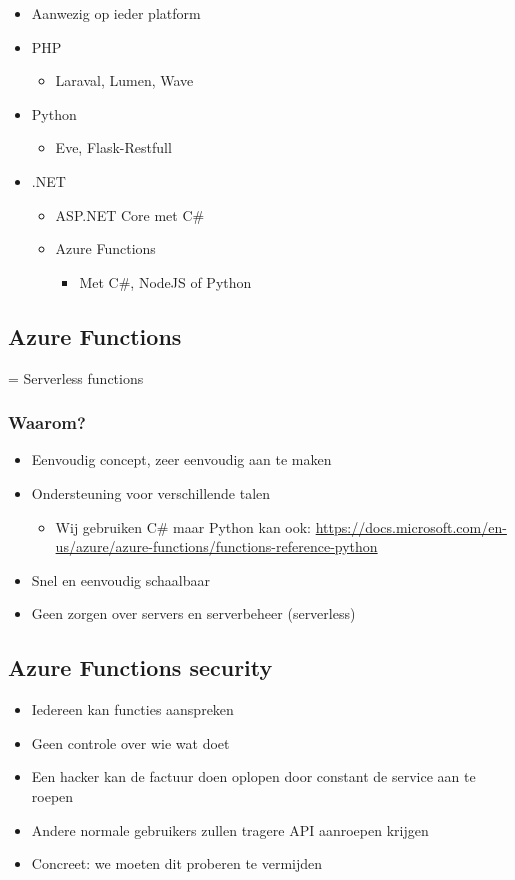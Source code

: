 \documentclass{article}
\begin{document}
\begin{itemize}
    \item Aanwezig op ieder platform
    \item PHP
    \begin{itemize}
        \item Laraval, Lumen, Wave
    \end{itemize}
    \item Python
    \begin{itemize}
        \item Eve, Flask-Restfull
    \end{itemize}
    \item .NET
    \begin{itemize}
        \item ASP.NET Core met C\#
        \item Azure Functions
        \begin{itemize}
            \item Met C\#, NodeJS of Python
        \end{itemize}
    \end{itemize}
\end{itemize}

\subsection{Azure Functions}
= Serverless functions 

\subsubsection{Waarom?}
\begin{itemize}
    \item Eenvoudig concept, zeer eenvoudig aan te maken
    \item Ondersteuning voor verschillende talen
    \begin{itemize}
        \item Wij gebruiken C\# maar Python kan ook: \url{https://docs.microsoft.com/en-us/azure/azure-functions/functions-reference-python}
    \end{itemize}
    \item Snel en eenvoudig schaalbaar
    \item Geen zorgen over servers en serverbeheer (serverless)
\end{itemize}

\subsection{Azure Functions security}
\begin{itemize}
    \item Iedereen kan functies aanspreken
    \item Geen controle over wie wat doet
    \item Een hacker kan de factuur doen oplopen door constant de service aan te roepen
    \item Andere normale gebruikers zullen tragere API aanroepen krijgen
    \item Concreet: we moeten dit proberen te vermijden
\end{itemize}
\end{document}
